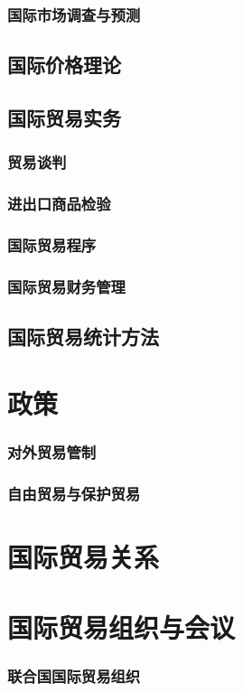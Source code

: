 \documentclass[UTF8]{../../RepresentationUniverse}
\begin{document}
        \subsubsection{国际市场调查与预测}
    \subsection{国际价格理论}
    \subsection{国际贸易实务}
        \subsubsection{贸易谈判}
        \subsubsection{进出口商品检验}
        \subsubsection{国际贸易程序}
        \subsubsection{国际贸易财务管理}
    \subsection{国际贸易统计方法}
\section{政策}
    \subsubsection{对外贸易管制}
    \subsubsection{自由贸易与保护贸易}
\section{国际贸易关系}
\section{国际贸易组织与会议}
    \subsubsection{联合国国际贸易组织}
\end{document}
